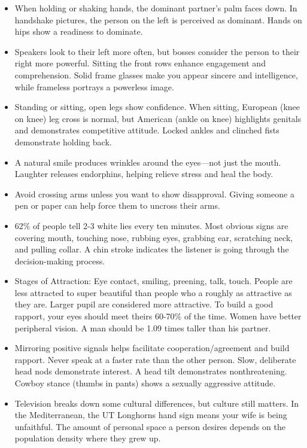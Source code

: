 \documentclass[
]{article}
\begin{document}
\begin{itemize}
\item
  When holding or shaking hands, the dominant partner's palm faces down.
  In handshake pictures, the person on the left is perceived as
  dominant. Hands on hips show a readiness to dominate.
\item
  Speakers look to their left more often, but bosses consider the person
  to their right more powerful. Sitting the front rows enhance
  engagement and comprehension. Solid frame glasses make you appear
  sincere and intelligence, while frameless portrays a powerless image.
\item
  Standing or sitting, open legs show confidence. When sitting, European
  (knee on knee) leg cross is normal, but American (ankle on knee)
  highlights genitals and demonstrates competitive attitude. Locked
  ankles and clinched fists demonstrate holding back.
\item
  A natural smile produces wrinkles around the eyes---not just the
  mouth. Laughter releases endorphins, helping relieve stress and heal
  the body.
\item
  Avoid crossing arms unless you want to show disapproval. Giving
  someone a pen or paper can help force them to uncross their arms.
\item
  62\% of people tell 2-3 white lies every ten minutes. Most obvious
  signs are covering mouth, touching nose, rubbing eyes, grabbing ear,
  scratching neck, and pulling collar. A chin stroke indicates the
  listener is going through the decision-making process.
\item
  Stages of Attraction: Eye contact, smiling, preening, talk, touch.
  People are less attracted to super beautiful than people who a roughly
  as attractive as they are. Larger pupil are considered more
  attractive. To build a good rapport, your eyes should meet theirs
  60-70\% of the time. Women have better peripheral vision. A man should
  be 1.09 times taller than his partner.
\item
  Mirroring positive signals helps facilitate cooperation/agreement and
  build rapport. Never speak at a faster rate than the other person.
  Slow, deliberate head nods demonstrate interest. A head tilt
  demonstrates nonthreatening. Cowboy stance (thumbs in pants) shows a
  sexually aggressive attitude.
\item
  Television breaks down some cultural differences, but culture still
  matters. In the Mediterranean, the UT Longhorns hand sign means your
  wife is being unfaithful. The amount of personal space a person
  desires depends on the population density where they grew up.
\end{itemize}
\end{document}
